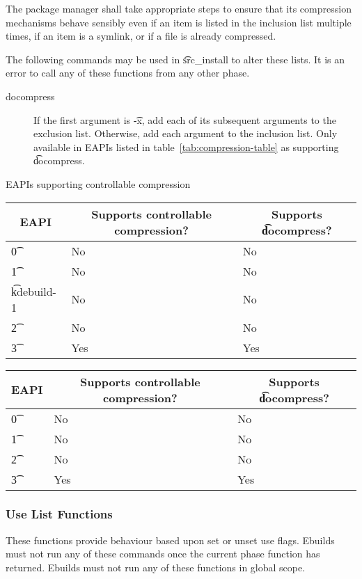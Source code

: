 The package manager shall take appropriate steps to ensure that its compression mechanisms behave
sensibly even if an item is listed in the inclusion list multiple times, if an item is a symlink,
or if a file is already compressed.

The following commands may be used in \t{src\_install} to alter these lists. It is an error to call
any of these functions from any other phase.

\begin{description}
\item[docompress] If the first argument is \t{-x}, add each of its subsequent arguments to the
exclusion list. Otherwise, add each argument to the inclusion list. Only available in EAPIs listed
in table~\ref{tab:compression-table} as supporting \t{docompress}.
\end{description}

\begin{centertable}{EAPIs supporting controllable compression} \label{tab:compression-table}
\IFKDEBUILDELSE
{
    \begin{tabular}{ l l l }
        \toprule
            \multicolumn{1}{c}{\textbf{EAPI}} &
            \multicolumn{1}{c}{\textbf{Supports controllable compression?}} &
            \multicolumn{1}{c}{\textbf{Supports \t{docompress}?}} \\
            \midrule
    \t{0} & No & No \\
    \t{1} & No & No \\
    \t{kdebuild-1} & No & No \\
    \t{2} & No & No \\
    \t{3} & Yes & Yes \\
    \bottomrule
    \end{tabular}
}{
    \begin{tabular}{ l l l }
        \toprule
            \multicolumn{1}{c}{\textbf{EAPI}} &
            \multicolumn{1}{c}{\textbf{Supports controllable compression?}} &
            \multicolumn{1}{c}{\textbf{Supports \t{docompress}?}} \\
            \midrule
    \t{0} & No & No \\
    \t{1} & No & No \\
    \t{2} & No & No \\
    \t{3} & Yes & Yes \\
    \bottomrule
    \end{tabular}
}
\end{centertable}

\subsubsection{Use List Functions}
These functions provide behaviour based upon set or unset use flags. Ebuilds must not run any of
these commands once the current phase function has returned. Ebuilds must not run any of these
functions in global scope.

